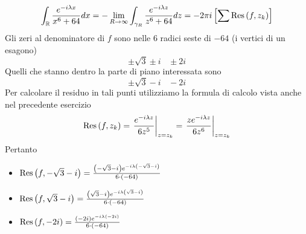 \begin{equation*}
\int _{\mathbb{R} }\frac{e^{ - i\lambda x}}{x^{6} + 64} dx = -\lim\limits _{R\rightarrow \infty }\int _{\gamma _{R}}\frac{e^{ - i\lambda z}}{z^{6} + 64} dz = -2\pi i\left[\sum \operatorname{Res} \left(f,z_{k}\right)\right]
\end{equation*}
Gli zeri al denominatore di $f$ sono nelle $6$ radici seste di $ - 64$ (i vertici di un esagono)
\begin{equation*}
\pm \sqrt{3} \pm i\ \ \ \ \pm 2i
\end{equation*}
Quelli che stanno dentro la parte di piano interessata sono
\begin{equation*}
\pm \sqrt{3} - i\ \ \ \ - 2i
\end{equation*}
Per calcolare il residuo in tali punti utilizziamo la formula di calcolo vista anche nel precedente esercizio
\begin{equation*}
\operatorname{Res} \left(f,z_{k}\right) = \left. \frac{e^{ - i\lambda z}}{6z^{5}}\right| _{z = z_{k}} = \left. \frac{ze^{ - i\lambda z}}{6z^{6}}\right| _{z = z_{k}}
\end{equation*}
Pertanto
\begin{itemize}
\item $\operatorname{Res} \left(f, - \sqrt{3} - i\right) = \frac{\left(- \sqrt{3} - i\right) e^{ - i\lambda \left(- \sqrt{3} - i\right)}}{6\cdot \left(- 64\right)}$
\item $\operatorname{Res} \left(f,\sqrt{3} - i\right) = \frac{\left(\sqrt{3} - i\right) e^{ - i\lambda \left(\sqrt{3} - i\right)}}{6\cdot \left(- 64\right)}$
\item $\operatorname{Res} \left(f, - 2i\right) = \frac{\left(- 2i\right) e^{ - i\lambda \left(- 2i\right)}}{6\cdot \left(- 64\right)}$
\end{itemize}


